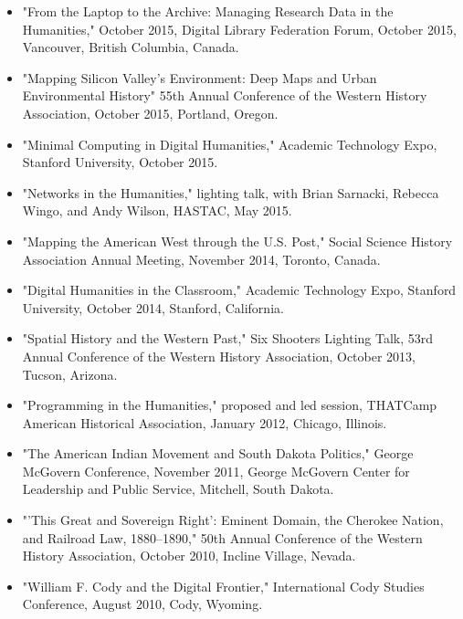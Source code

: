 \documentclass[10pt]{article}
\begin{document}
\begin{itemize}
  \item "From the Laptop to the Archive: Managing Research Data in the Humanities," October 2015, Digital Library Federation Forum, October 2015, Vancouver, British Columbia, Canada.
  
  \item "Mapping Silicon Valley's Environment: Deep Maps and Urban Environmental History" 55th Annual Conference of the Western History Association, October 2015, Portland, Oregon.
  
  \item "Minimal Computing in Digital Humanities," Academic Technology Expo, Stanford University, October 2015.
  
  \item "Networks in the Humanities," lighting talk, with Brian Sarnacki, Rebecca Wingo, and Andy Wilson, HASTAC, May 2015.
  
  \item "Mapping the American West through the U.S. Post," Social Science History Association Annual Meeting, November 2014, Toronto, Canada.
  
  \item "Digital Humanities in the Classroom," Academic Technology Expo, Stanford University, October 2014, Stanford, California.
  
  \item "Spatial History and the Western Past," Six Shooters Lighting Talk, 53rd Annual Conference of the Western History Association, October 2013, Tucson, Arizona.
  
  \item "Programming in the Humanities," proposed and led session, THATCamp American Historical Association, January 2012, Chicago, Illinois.
  
  \item "The American Indian Movement and South Dakota Politics," George McGovern Conference, November 2011, George McGovern Center for Leadership and Public Service, Mitchell, South Dakota.
  
  \item "'This Great and Sovereign Right': Eminent Domain, the Cherokee Nation, and Railroad Law, 1880--1890," 50th Annual Conference of the Western History Association, October 2010, Incline Village, Nevada.
  
  \item "William F. Cody and the Digital Frontier," International Cody Studies Conference, August 2010, Cody, Wyoming.
  

\end{itemize}
\end{document}
